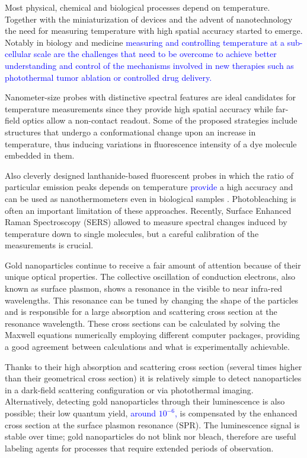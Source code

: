 \documentclass[journal=nalefd,manuscript=letter]{achemso}
\newcommand{\HI}[1]{\textcolor{blue}{#1}} %
\begin{document}
Most physical, chemical and biological processes depend on
temperature. Together with the miniaturization of devices and the advent of
nanotechnology the need for measuring temperature with high spatial accuracy
started to emerge. Notably in biology\cite{Yang2011a,Hrelescu2010} and
medicine\cite{Li2013c} \HI{measuring and controlling temperature at a sub-cellular 
scale are the challenges that need to be overcome to achieve better understanding and control 
of the mechanisms involved in new therapies such as photothermal tumor ablation\cite{Gobin2007} 
or controlled drug delivery\cite{Huang2006,Huo2014}.}

Nanometer-size probes with distinctive spectral features are ideal candidates
for temperature measurements since they provide high spatial accuracy while
far-field optics allow a non-contact readout. Some of the proposed strategies
include structures that undergo a conformational change upon an increase in
temperature\cite{Ebrahimi2014}, thus inducing variations in fluorescence
intensity of a dye molecule embedded in them.

Also cleverly designed lanthanide-based fluorescent probes in which the ratio of
particular emission peaks depends on temperature \HI{provide} a high accuracy and can
be used as nanothermometers \cite{liu2016ratiometric} even in biological samples
\cite{Vetrone2010}. Photobleaching is often an important limitation of these
approaches. Recently, Surface Enhanced Raman Spectroscopy (SERS) allowed to
measure spectral changes induced by temperature down to single
molecules\cite{Pozzi2015}, but a careful calibration of the measurements is
crucial.

Gold nanoparticles continue to receive a fair amount of attention because of
their unique optical properties\cite{Zijlstra2011}. The collective oscillation
of conduction electrons, also known as surface plasmon, shows a resonance in the visible to
near infra-red wavelengths. This resonance can be tuned by changing the shape of
the particles\cite{Carattino2016} and is responsible for a large absorption
and scattering cross section at the resonance wavelength. These cross sections can
be calculated by solving the Maxwell equations numerically employing different computer
packages\cite{Draine1994,Yurkin2011,Oskooi2010}, providing a good agreement
between calculations and what is experimentally achievable. 

Thanks to their high absorption and scattering cross section (several times higher
than their geometrical cross section) it is relatively simple to detect
nanoparticles in a dark-field scattering configuration\cite{Hu2008} or via
photothermal imaging\cite{boyer2002photothermal, Berciaud2006}.
Alternatively, detecting gold nanoparticles through their
luminescence\cite{Tcherniak2011} is also possible; their low quantum
yield\cite{Fang2012,Rao2015,Yorulmaz2012,Cheng2015}, \HI{around $10^{-6}$,}	
is compensated by the enhanced cross section at the surface plasmon resonance
(SPR). The luminescence signal is stable over time; gold nanoparticles do not
blink nor bleach, therefore are useful labeling agents for processes that
require extended periods of observation\cite{Wang2005}.
\end{document}
